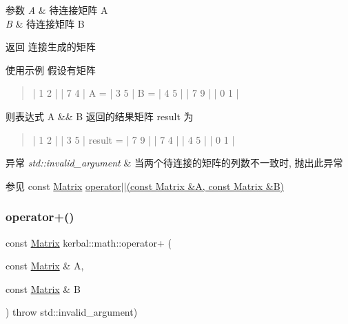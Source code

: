 \begin{DoxyParams}{参数}
{\em A} & 待连接矩阵 A \\
\hline
{\em B} & 待连接矩阵 B \\
\hline
\end{DoxyParams}
\begin{DoxyReturn}{返回}
连接生成的矩阵 
\end{DoxyReturn}
\begin{DoxyParagraph}{使用示例}
假设有矩阵~\newline
\begin{quote}
\begin{DoxyVerb}    | 1 2 |          | 7 4 |
A = | 3 5 |      B = | 4 5 |
    | 7 9 |          | 0 1 |
\end{DoxyVerb}


\end{quote}
则表达式 A \&\& B 返回的结果矩阵 result 为~\newline
\begin{quote}
\begin{DoxyVerb}         | 1 2 |
         | 3 5 |
result = | 7 9 |
         | 7 4 |
         | 4 5 |
         | 0 1 |
\end{DoxyVerb}


\end{quote}

\end{DoxyParagraph}

\begin{DoxyExceptions}{异常}
{\em std\+::invalid\+\_\+argument} & 当两个待连接的矩阵的列数不一致时, 抛出此异常 \\
\hline
\end{DoxyExceptions}
\begin{DoxySeeAlso}{参见}
const \hyperlink{classkerbal_1_1math_1_1_matrix}{Matrix} \hyperlink{namespacekerbal_1_1math_a51f431f1f41e3bda5fe59a6854c3d3f7}{operator$\vert$$\vert$(const Matrix \&\+A, const Matrix \&\+B)} 
\end{DoxySeeAlso}
\mbox{\label{namespacekerbal_1_1math_aec1b63008ae51a5c8143fc8919c8cc85}} 
\subsubsection{\texorpdfstring{operator+()}{operator+()}}
{\footnotesize\ttfamily const \hyperlink{classkerbal_1_1math_1_1_matrix}{Matrix} kerbal\+::math\+::operator+ (\begin{DoxyParamCaption}\item[{const \hyperlink{classkerbal_1_1math_1_1_matrix}{Matrix} \&}]{A,  }\item[{const \hyperlink{classkerbal_1_1math_1_1_matrix}{Matrix} \&}]{B }\end{DoxyParamCaption}) throw  std\+::invalid\+\_\+argument) }


